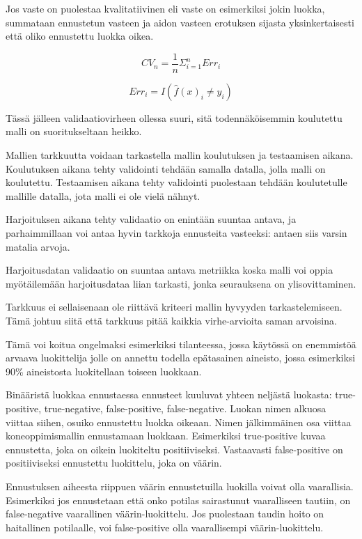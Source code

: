 \documentclass[finnish,twoside,openright]{HYgraduMLDS}
\begin{document}
Jos vaste on puolestaa kvalitatiivinen eli vaste on esimerkiksi jokin luokka, summataan ennustetun vasteen ja aidon vasteen erotuksen sijasta yksinkertaisesti että oliko ennustettu luokka oikea\cite{james2013ISLR}.

\begin{equation}
    CV_{n} = \frac{1}{n} \Sigma^n_{i=1} Err_i
\end{equation}

\begin{equation} \label{eq:clf_error}
    Err_i = I(\hat{f}(x)_i \neq y_i)
\end{equation}

Tässä jälleen validaatiovirheen ollessa suuri, sitä todennäköisemmin koulutettu malli on suoritukseltaan heikko.

Mallien tarkkuutta voidaan tarkastella mallin koulutuksen ja testaamisen aikana. Koulutuksen aikana tehty validointi tehdään samalla datalla, jolla malli on koulutettu. Testaamisen aikana tehty validointi puolestaan tehdään koulutetulle mallille datalla, jota malli ei ole vielä nähnyt.

Harjoituksen aikana tehty validaatio on enintään suuntaa antava, ja parhaimmillaan voi antaa hyvin tarkkoja ennusteita vasteeksi: antaen siis varsin matalia arvoja. 

Harjoitusdatan validaatio on suuntaa antava metriikka koska malli voi oppia myötäilemään harjoitusdataa liian tarkasti, jonka seurauksena on ylisovittaminen.

Tarkkuus ei sellaisenaan ole riittävä kriteeri mallin hyvyyden tarkastelemiseen. Tämä johtuu siitä että tarkkuus pitää kaikkia virhe-arvioita saman arvoisina.

Tämä voi koitua ongelmaksi esimerkiksi tilanteessa, jossa käytössä on enemmistöä arvaava luokittelija jolle on annettu todella epätasainen aineisto, jossa esimerkiksi 90\% aineistosta luokitellaan toiseen luokkaan.

Binääristä luokkaa ennustaessa ennusteet kuuluvat yhteen neljästä luokasta: true-positive, true-negative, false-positive, false-negative.  Luokan nimen alkuosa viittaa siihen, osuiko ennustettu luokka oikeaan. Nimen jälkimmäinen osa viittaa koneoppimismallin ennustamaan luokkaan. Esimerkiksi true-positive kuvaa ennustetta, joka on oikein luokiteltu positiiviseksi. Vastaavasti false-positive on positiiviseksi ennustettu luokittelu, joka on väärin.

Ennustuksen aiheesta riippuen väärin ennustetuilla luokilla voivat olla vaarallisia. Esimerkiksi jos ennustetaan että onko potilas sairastunut vaaralliseen tautiin, on false-negative vaarallinen väärin-luokittelu. Jos puolestaan taudin hoito on haitallinen potilaalle, voi false-positive olla vaarallisempi väärin-luokittelu.
\end{document}
